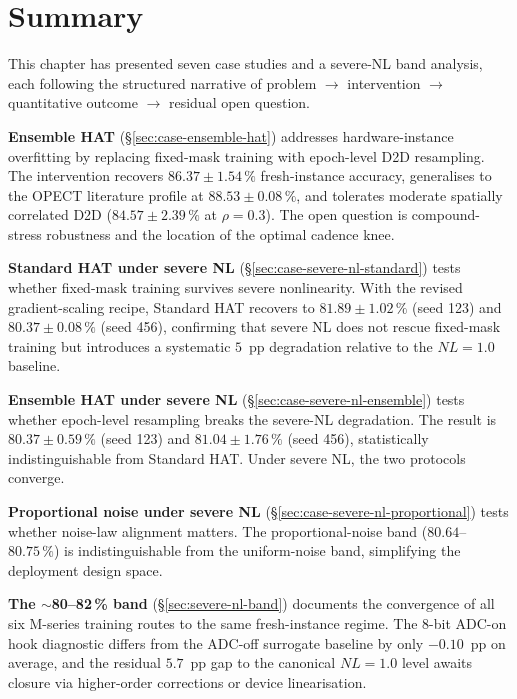 \section{Summary}

This chapter has presented seven case studies and a severe-NL band analysis, each following the structured narrative of problem $\rightarrow$ intervention $\rightarrow$ quantitative outcome $\rightarrow$ residual open question.

\textbf{Ensemble HAT} (\S\ref{sec:case-ensemble-hat}) addresses hardware-instance overfitting by replacing fixed-mask training with epoch-level D2D resampling.  The intervention recovers $86.37\pm1.54\,\%$ fresh-instance accuracy, generalises to the OPECT literature profile at $88.53\pm0.08\,\%$, and tolerates moderate spatially correlated D2D ($84.57\pm2.39\,\%$ at $\rho=0.3$).  The open question is compound-stress robustness and the location of the optimal cadence knee.

\textbf{Standard HAT under severe NL} (\S\ref{sec:case-severe-nl-standard}) tests whether fixed-mask training survives severe nonlinearity.  With the revised gradient-scaling recipe, Standard HAT recovers to $81.89\pm1.02\,\%$ (seed 123) and $80.37\pm0.08\,\%$ (seed 456), confirming that severe NL does not rescue fixed-mask training but introduces a systematic $5$~pp degradation relative to the $NL=1.0$ baseline.

\textbf{Ensemble HAT under severe NL} (\S\ref{sec:case-severe-nl-ensemble}) tests whether epoch-level resampling breaks the severe-NL degradation.  The result is $80.37\pm0.59\,\%$ (seed 123) and $81.04\pm1.76\,\%$ (seed 456), statistically indistinguishable from Standard HAT.  Under severe NL, the two protocols converge.

\textbf{Proportional noise under severe NL} (\S\ref{sec:case-severe-nl-proportional}) tests whether noise-law alignment matters.  The proportional-noise band ($80.64$--$80.75\,\%$) is indistinguishable from the uniform-noise band, simplifying the deployment design space.

\textbf{The $\sim$80--82\,\% band} (\S\ref{sec:severe-nl-band}) documents the convergence of all six M-series training routes to the same fresh-instance regime.  The 8-bit ADC-on hook diagnostic differs from the ADC-off surrogate baseline by only $-0.10$~pp on average, and the residual $5.7$~pp gap to the canonical $NL=1.0$ level awaits closure via higher-order corrections or device linearisation.

